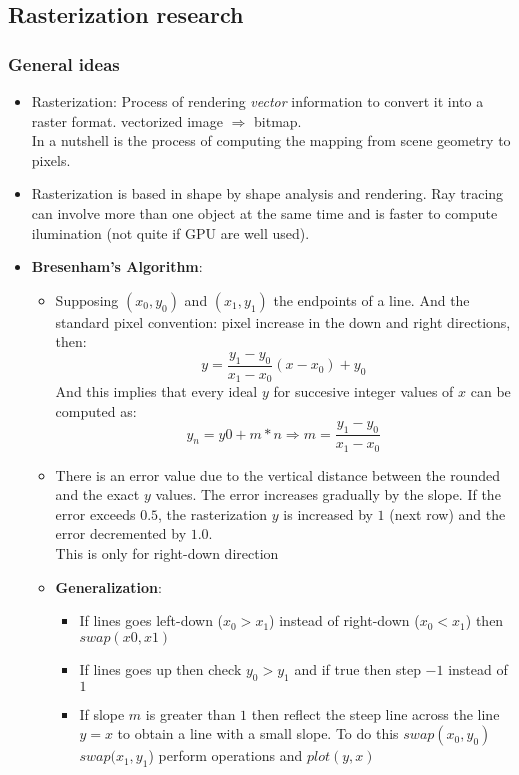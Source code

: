 \documentclass{article}
\begin{document}
\subsection{Rasterization research}

\subsubsection*{General ideas}

\begin{itemize}
\item Rasterization: Process of rendering \emph{vector} information
  to convert it into a raster format. vectorized image $\Rightarrow$ bitmap.\\
  In a nutshell is the process of computing the mapping from scene geometry
  to pixels.
  
\item Rasterization is based in shape by shape analysis and rendering. Ray
  tracing can involve more than one object at the same time and is faster
  to compute ilumination (not quite if GPU are well used).
  
\item \textbf{Bresenham's Algorithm}:
  \begin{itemize}
  \item Supposing $(x_0,y_0)$ and $(x_1,y_1)$ the endpoints of a line. And
     the standard pixel convention: pixel increase in the down and right
     directions, then:
     $$y=\frac{y_1-y_0}{x_1-x_0}(x-x_0) + y_0$$
     And this implies that every ideal $y$ for succesive integer values of
     $x$ can be computed as:
     $$y_n = y0 + m*n \Rightarrow m =\frac{y_1-y_0}{x_1-x_0} $$

  \item There is an error value due to the vertical distance between the rounded
    and the exact $y$ values. The error increases gradually by the slope.
    If the error exceeds $0.5$, the rasterization $y$ is increased by $1$ 
    (next row) and the error decremented by $1.0$.\\
    This is only for right-down direction

  \item \textbf{Generalization}: 
    \begin{itemize}
    \item 
      If lines goes left-down ($x_0>x_1$) instead of right-down ($x_0<x_1$)
      then $swap(x0,x1)$
    \item
      If lines goes up then check $y_0>y_1$ and if true then step $-1$ instead
      of $1$
    \item
      If slope $m$ is greater than $1$ then reflect the steep line across the
      line $y=x$ to obtain a line with a small slope. To do this
      $swap(x_0,y_0)$ $swap(x_1,y_1$) perform operations and $plot(y,x)$
    \end{itemize}

  \end{itemize}

\end{itemize}
\end{document}
